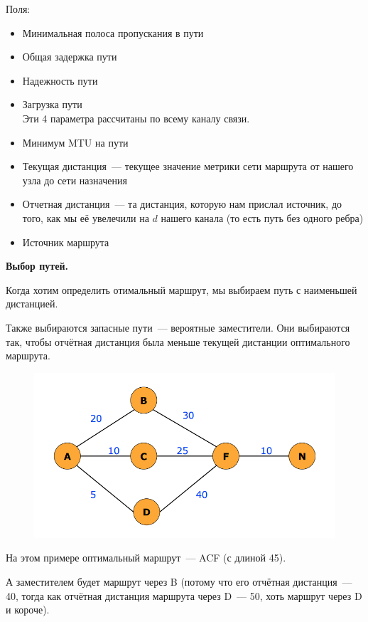 Поля:
\begin{itemize}
    \item Минимальная полоса пропускания в пути
    \item Общая задержка пути
    \item Надежность пути
    \item Загрузка пути\\
    Эти 4 параметра рассчитаны по всему каналу связи.
    \item Минимум MTU на пути
    \item Текущая дистанция~--- текущее значение метрики сети маршрута от нашего узла до сети назначения
    \item Отчетная дистанция~--- та дистанция, которую нам прислал источник, до того, как мы её увелечили на $d$ нашего канала (то есть путь без одного ребра)
    \item Источник маршрута
\end{itemize}

{\bf Выбор путей.}

Когда хотим определить отимальный маршрут, мы выбираем путь с наименьшей дистанцией.

Также выбираются запасные пути~--- вероятные заместители. Они выбираются так, чтобы отчётная дистанция была меньше текущей дистанции оптимального маршрута.

\begin{figure}[H]
  \centering
  \includegraphics[width=15cm]{images/04/09}
\end{figure}

На этом примере оптимальный маршрут~--- ACF (с длиной 45).

А заместителем будет маршрут через B (потому что его отчётная дистанция~--- 40, тогда как отчётная дистанция маршрута через D~--- 50, хоть маршрут через D и короче).

